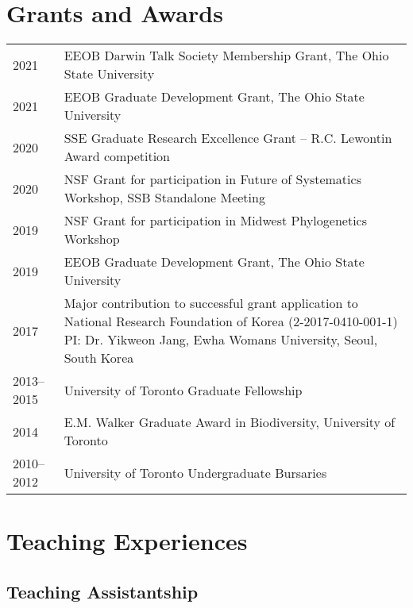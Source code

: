 \documentclass[11pt]{article}
\begin{document}
\hspace{0pt}



\section*{Grants and Awards}

\begin{longtable}{p{}  p{}}%
2021 &	EEOB Darwin Talk Society Membership Grant, The Ohio State University\\
2021 &	EEOB Graduate Development Grant, The Ohio State University\\
2020 &	SSE Graduate Research Excellence Grant – R.C. Lewontin Award competition\\%
2020 &	NSF Grant for participation in Future of Systematics Workshop, SSB Standalone Meeting\\
2019 &	NSF Grant for participation in Midwest Phylogenetics Workshop\\
2019 &	EEOB Graduate Development Grant, The Ohio State University\\
2017 &	Major contribution to successful grant application to 	National Research Foundation of Korea (2-2017-0410-001-1) PI: Dr. Yikweon Jang, Ewha Womans University, Seoul, South Korea \\%
2013--2015 & University of Toronto Graduate Fellowship\\
2014 &	E.M. Walker Graduate Award in Biodiversity, University of Toronto\\%
2010--2012 &	University of Toronto Undergraduate Bursaries\\%

\end{longtable}


\hspace{0pt}



\section*{Teaching Experiences}

\subsection*{Teaching Assistantship}
\end{document}
